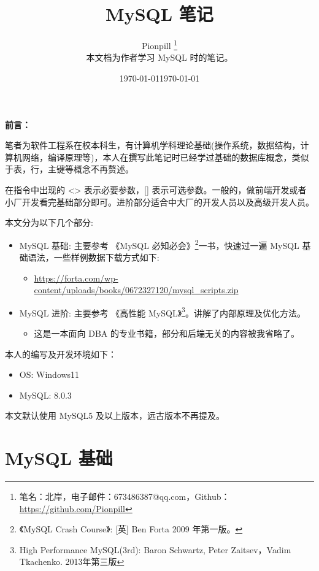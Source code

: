 \documentclass{PionpillNote-book}
\title{MySQL 笔记}
\author{
    Pionpill \footnote{笔名：北岸，电子邮件：673486387@qq.com，Github：\url{https://github.com/Pionpill}} \\
    本文档为作者学习 MySQL 时的笔记。\\
}
\date{\today}
\begin{document}
\pagestyle{plain}
\maketitle

\noindent\textbf{前言：}

笔者为软件工程系在校本科生，有计算机学科理论基础(操作系统，数据结构，计算机网络，编译原理等)，本人在撰写此笔记时已经学过基础的数据库概念，类似于表，行，主键等概念不再赘述。

在指令中出现的 <> 表示必要参数，[] 表示可选参数。一般的，做前端开发或者小厂开发看完基础部分即可。进阶部分适合中大厂的开发人员以及高级开发人员。

本文分为以下几个部分:
\begin{itemize}
    \item MySQL 基础: 主要参考 《MySQL 必知必会》\footnote{《MySQL Crash Course》: [英] Ben Forta 2009 年第一版。}一书，快速过一遍 MySQL 基础语法，一些样例数据下载方式如下:
    \begin{itemize}
        \item \url{https://forta.com/wp-content/uploads/books/0672327120/mysql_scripts.zip}
    \end{itemize}
    \item MySQL 进阶: 主要参考 《高性能 MySQL》\footnote{High Performance MySQL(3rd): Baron Schwartz, Peter Zaitsev，Vadim Tkachenko. 2013年第三版}。讲解了内部原理及优化方法。
    \begin{itemize}
        \item 这是一本面向 DBA 的专业书籍，部分和后端无关的内容被我省略了。
    \end{itemize}
\end{itemize}

本人的编写及开发环境如下：
\begin{itemize}
    \item OS: Windows11 
    \item MySQL: 8.0.3
\end{itemize}

本文默认使用 MySQL5 及以上版本，远古版本不再提及。

\date{\today}
\newpage

\tableofcontents

\newpage

\setcounter{page}{1} 
\pagestyle{fancy}

\part{MySQL 基础}
\end{document}
